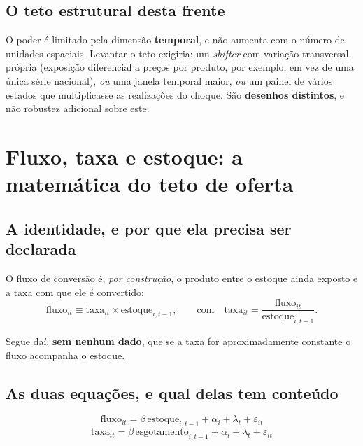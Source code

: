 \section{O teto estrutural desta frente}

\begin{naodiz}
O poder é limitado pela dimensão \textbf{temporal}, e não aumenta com o número
de unidades espaciais. Levantar o teto exigiria: um \emph{shifter} com variação
transversal própria (exposição diferencial a preços por produto, por exemplo,
em vez de uma única série nacional), \emph{ou} uma janela temporal maior,
\emph{ou} um painel de vários estados que multiplicasse as realizações do
choque. São \textbf{desenhos distintos}, e não robustez adicional sobre este.
\end{naodiz}

\chapter{Fluxo, taxa e estoque: a matemática do teto de oferta}
\label{cap:oferta}

\section{A identidade, e por que ela precisa ser declarada}

O fluxo de conversão é, \emph{por construção}, o produto entre o estoque ainda
exposto e a taxa com que ele é convertido:
\begin{equation}
\text{fluxo}_{it} \equiv \text{taxa}_{it} \times \text{estoque}_{i,t-1},
\qquad \text{com}\quad \text{taxa}_{it} = \frac{\text{fluxo}_{it}}{\text{estoque}_{i,t-1}}.
\end{equation}

Segue daí, \textbf{sem nenhum dado}, que se a taxa for aproximadamente constante
o fluxo acompanha o estoque.

\section{As duas equações, e qual delas tem conteúdo}

\begin{equation}
\text{fluxo}_{it} = \beta\, \text{estoque}_{i,t-1} + \alpha_i + \lambda_t + \varepsilon_{it}
\label{eq:b1}
\end{equation}
\begin{equation}
\text{taxa}_{it} = \beta\, \text{esgotamento}_{i,t-1} + \alpha_i + \lambda_t + \varepsilon_{it}
\label{eq:b2b}
\end{equation}

